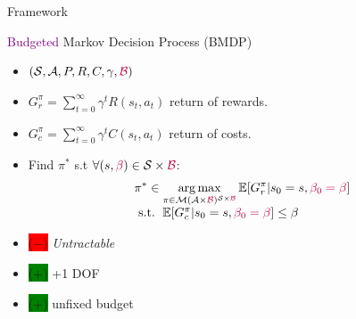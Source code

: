 \documentclass{beamer}
\newcommand{\cplus}{\colorbox{green}{($+$)} }
\newcommand{\cmoins}{\colorbox{red}{($-$)} }
\begin{document}
    \begin{frame}{Framework}

        \begin{block}{\textcolor{purple}{Budgeted} Markov Decision Process (BMDP)}
            \begin{itemize}
                \item $(\mathcal{S}, \mathcal{A}, P, R,{C}, \gamma,\textcolor{purple}{\mathcal{B}})$
                \item $G_r^\pi = \sum_{t=0}^\infty \gamma^t R(s_t, a_t)$ return of rewards.
                \item  $G_c^\pi = \sum_{t=0}^\infty \gamma^t C(s_t, a_t)$ return of costs.
                \item Find $\pi^*$ s.t $\forall (s,\textcolor{purple}{\beta})\in\mathcal{S}\times\textcolor{purple}{\mathcal{B}}$:
                \begin{equation}
                    \label{eq:bmdp}
                    \begin{array}{lcr}
                        \displaystyle \pi^* \in \operatorname*{arg\,max}_{\pi\in\mathcal{M}(\mathcal{A}\times\textcolor{purple}{\mathcal{B}})^{\mathcal{S}\times\textcolor{purple}{\mathcal{B}}}} \operatorname*{\mathbb{E}}[G_r^\pi | s_0=s,\textcolor{purple}{\beta_0=\beta}] \\
                        \text{ s.t. }  \operatorname*{\mathbb{E}}[G_c^\pi | s_0=s,\textcolor{purple}{\beta_0=\beta}] \leq \beta
                    \end{array}
                \end{equation}
            \end{itemize}
        \end{block}


        \begin{block}{}
            \begin{itemize}
                \item \cmoins \textit{Untractable}
                \item \cplus +1 DOF
                \item \cplus unfixed budget

            \end{itemize}
        \end{block}

    \end{frame}
\end{document}
